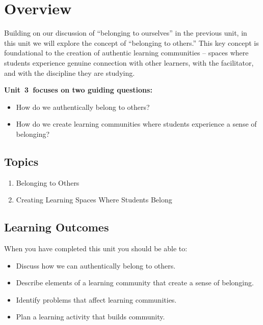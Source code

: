 \documentclass[
]{book}
\providecommand{\tightlist}{%
  \setlength{\itemsep}{0pt}\setlength{\parskip}{0pt}}
\begin{document}
\hypertarget{overview-2}{%
\section*{Overview}\label{overview-2}}

Building on our discussion of ``belonging to ourselves'' in the previous
unit, in this unit we will explore the concept of ``belonging to others.''
This key concept is foundational to the creation of authentic learning
communities -- spaces where students experience genuine connection with
other learners, with the facilitator, and with the discipline they are
studying.

\textbf{Unit~3~focuses on two guiding questions:}

\begin{itemize}
\tightlist
\item
  How do we authentically belong to others?\\
\item
  How do we create learning communities where students experience a sense of belonging?
\end{itemize}

\hypertarget{topics-2}{%
\subsection*{Topics}\label{topics-2}}

\begin{enumerate}
\def\labelenumi{\arabic{enumi}.}
\tightlist
\item
  Belonging to Others
\item
  Creating Learning Spaces Where Students Belong
\end{enumerate}

\hypertarget{learning-outcomes-2}{%
\subsection*{Learning Outcomes}\label{learning-outcomes-2}}

When you have completed this unit you should be able to:

\begin{itemize}
\tightlist
\item
  Discuss how we can authentically belong to others.\\
\item
  Describe elements of a learning community that create a sense of belonging.\\
\item
  Identify problems that affect learning communities.\\
\item
  Plan a learning activity that builds community.
\end{itemize}
\end{document}
